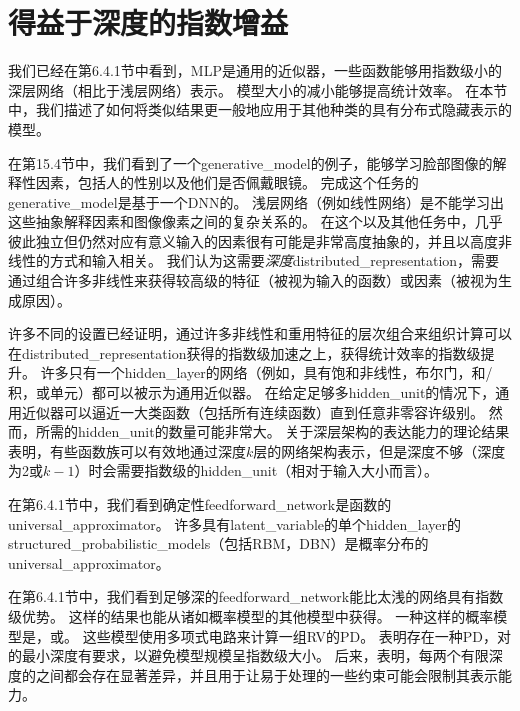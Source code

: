 \section{得益于深度的指数增益}
\label{sec:exponential_gains_from_depth}
我们已经在第6.4.1节中看到，\gls{MLP}是通用的近似器，一些函数能够用指数级小的深层网络（相比于浅层网络）表示。
模型大小的减小能够提高统计效率。
在本节中，我们描述了如何将类似结果更一般地应用于其他种类的具有分布式隐藏表示的模型。


在第15.4节中，我们看到了一个\gls{generative_model}的例子，能够学习脸部图像的解释性因素，包括人的性别以及他们是否佩戴眼镜。
完成这个任务的\gls{generative_model}是基于一个\gls{DNN}的。
浅层网络（例如线性网络）是不能学习出这些抽象解释因素和图像像素之间的复杂关系的。
在这个以及其他任务中，几乎彼此独立但仍然对应有意义输入的因素很有可能是非常高度抽象的，并且以高度非线性的方式和输入相关。
我们认为这需要\emph{深度}\gls{distributed_representation}，需要通过组合许多非线性来获得较高级的特征（被视为输入的函数）或因素（被视为生成原因）。


许多不同的设置已经证明，通过许多非线性和重用特征的层次组合来组织计算可以在\gls{distributed_representation}获得的指数级加速之上，获得统计效率的指数级提升。
许多只有一个\gls{hidden_layer}的网络（例如，具有饱和非线性，布尔门，和/积，或单元）都可以被示为通用近似器。
在给定足够多\gls{hidden_unit}的情况下，通用近似器可以逼近一大类函数（包括所有连续函数）直到任意非零容许级别。
然而，所需的\gls{hidden_unit}的数量可能非常大。
关于深层架构的表达能力的理论结果表明，有些函数族可以有效地通过深度$k$层的网络架构表示，但是深度不够（深度为2或$k-1$）时会需要指数级的\gls{hidden_unit}（相对于输入大小而言）。


在第6.4.1节中，我们看到确定性\gls{feedforward_network}是函数的\gls{universal_approximator}。
许多具有\gls{latent_variable}的单个\gls{hidden_layer}的\gls{structured_probabilistic_models}（包括\gls{RBM}，\gls{DBN}）是概率分布的\gls{universal_approximator}\citep{LeRoux-Bengio-2007-TR,Montufar-2011,Montufar-et-al-NIPS2014,Krause-et-al-ICML2013}。


在第6.4.1节中，我们看到足够深的\gls{feedforward_network}能比太浅的网络具有指数级优势。
这样的结果也能从诸如概率模型的其他模型中获得。
一种这样的概率模型是，或\citep{Poon+Domingos-2011}。
这些模型使用多项式电路来计算一组\gls{RV}的\gls{PD}。
\cite{Delalleau+Bengio-2011-small}表明存在一种\gls{PD}，对的最小深度有要求，以避免模型规模呈指数级大小。
后来，\cite{Martens+Medabalimi-arxiv2014}表明，每两个有限深度的之间都会存在显著差异，并且用于让易于处理的一些约束可能会限制其表示能力。


